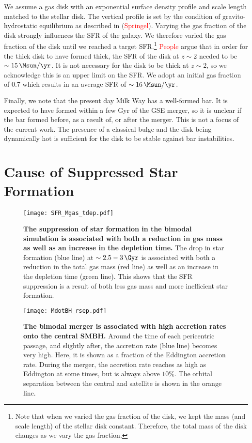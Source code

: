We assume a gas disk with an exponential surface density profile and scale
length matched to the stellar disk. The vertical profile is set by the condition
of gravito-hydrostatic equilibrium as described in (\textcolor{red}{Springel}).
Varying the gas fraction of the disk strongly influences the SFR of the galaxy.
We therefore varied the gas fraction of the disk until we reached a target
SFR.\footnote{Note that when we varied the gas fraction of the disk, we kept the
mass (and scale length) of the stellar disk constant. Therefore, the total mass
of the disk changes as we vary the gas fraction.} \textcolor{red}{People} argue
that in order for the thick disk to have formed thick, the SFR of the disk at
$z\sim2$ needed to be $\sim15\,\Msun/\yr$. It is not necessary for the disk to
be thick at $z\sim2$, so we acknowledge this is an upper limit on the SFR. We
adopt an initial gas fraction of $0.7$ which results in an average SFR of
$\sim16\,\Msun/\yr$.

Finally, we note that the present day Milk Way has a well-formed bar. It is
expected to have formed within a few Gyr of the GSE merger, so it is unclear if
the bar formed before, as a result of, or after the merger. This is not a focus
of the current work. The presence of a classical bulge and the disk being
dynamically hot is sufficient for the disk to be stable against bar
instabilities.

\section{Cause of Suppressed Star Formation}\label{app:cause_qui}

\begin{figure*}
  \centering
  \texttt{[image: SFR\_Mgas\_tdep.pdf]}
  \caption{\textbf{The suppression of star formation in the bimodal simulation is associated with both a reduction in gas mass as well as an increase in the depletion time.} The drop in star formation (blue line) at $\sim2.5-3\,\Gyr$ is associated with both a reduction in the total gas mass (red line) as well as an increase in the depletion time (green line). This shows that the SFR suppression is a result of both less gas mass and more inefficient star formation. }
  \label{fig:SFR_Mgas_tdep}
\end{figure*}

\begin{figure}
  \centering
  \texttt{[image: MdotBH\_rsep.pdf]}
  \caption{\textbf{The bimodal merger is associated with high accretion rates onto the central SMBH.} Around the time of each pericentric passage, and slightly after, the accretion rate (blue line) becomes very high. Here, it is shown as a fraction of the Eddington accretion rate. During the merger, the accretion rate reaches as high as Eddington at some times, but is always above $10\%$. The orbital separation between the central and satellite is shown in the orange line.}
  \label{fig:MdotBH_rsep}
\end{figure}